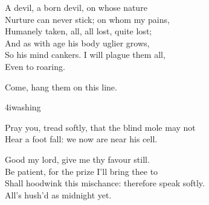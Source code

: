 
\exit{}

\begin{verse_speech}[Prospero] 
A devil, a born devil, on whose nature\\
Nurture can never stick; on whom my pains,\\
Humanely taken, all, all lost, quite lost;\\
And as with age his body uglier grows,\\
So his mind cankers. I will plague them all,\\
Even to roaring.


Come, hang them on this line.

\end{verse_speech}

	\begin{bwbigpic}
		[\picwidth]
		{4iwashing}
		{}
	\end{bwbigpic}


\begin{verse_speech}[Caliban] 
Pray you, tread softly, that the blind mole may not\\
Hear a foot fall: we now are near his cell.
\end{verse_speech}





\begin{verse_speech}[Caliban] 
Good my lord, give me thy favour still.\\
Be patient, for the prize I'll bring thee to\\
Shall hoodwink this mischance: therefore speak softly.\\
All's hush'd as midnight yet.
\end{verse_speech}

